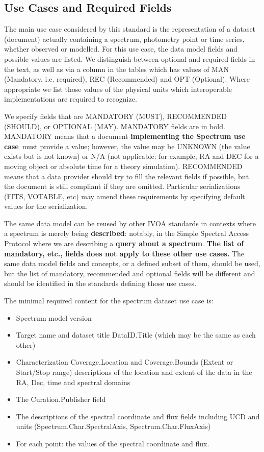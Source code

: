 \documentclass[11pt]{article}
\begin{document}
\subsection{Use Cases and Required Fields}

The main use case considered by this standard is the representation
of a dataset (document) actually containing a spectrum, photometry point or time series,
whether observed or modelled. 
For this use case,
the data model fields and possible values
are listed. 
We distinguish between optional and required fields in the
text, as well as via a 
column in the tables which has values of MAN (Mandatory, i.e. required),
REC (Recommended) and OPT (Optional).
Where appropriate we list those values of the physical units which interoperable
implementations are required to recognize.

We specify fields that are MANDATORY (MUST), RECOMMENDED (SHOULD), or
OPTIONAL (MAY). MANDATORY fields are in bold. MANDATORY means that a
document {\bf implementing the Spectrum use case}~must provide a value; however, the value may be UNKNOWN (the
value exists but is not known) or N/A (not applicable: for example, RA
and DEC for a moving object or absolute time for a theory simulation).
RECOMMENDED means that a data provider should try to fill the relevant
fields if possible, but the document is still compliant if they are
omitted. Particular serializations (FITS, VOTABLE, etc) may 
amend these requirements by specifying default values for the
serialization. 

The same data model can be reused by other IVOA standards in contexts where a spectrum is
merely being {\bf described}: notably, in the Simple Spectral Access
Protocol where we are describing a {\bf query about a spectrum}. {\bf
The list of mandatory, etc., fields does not apply to these other use cases.}
The same data model fields and concepts, or a
defined subset of them, should be used, but the list of mandatory,
recommended and optional fields will be different and should be
identified in the standards defining those use cases.

The minimal required content for the spectrum dataset use case is:

\begin{itemize}
\item Spectrum model version
\item Target name and dataset title DataID.Title (which may be the same as each other)
\item  Characterization Coverage.Location and Coverage.Bounds (Extent or Start/Stop range) descriptions
       of the location and extent of the data in the RA, Dec, time and spectral domains
\item  The Curation.Publisher field
\item  The descriptions of the spectral coordinate and flux
fields including UCD and units  (Spectrum.Char.SpectralAxis, Spectrum.Char.FluxAxis)
\item  For each point: the values of the spectral coordinate and flux.
\end{itemize}
\end{document}
